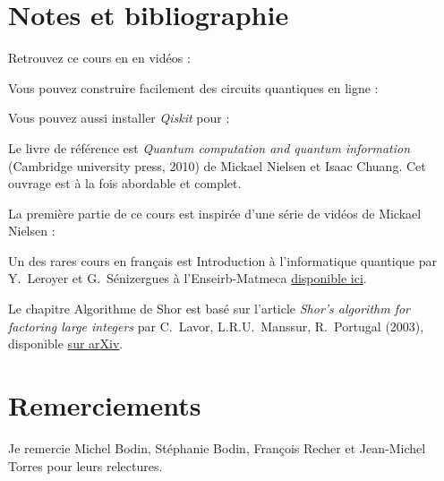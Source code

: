 
\clearemptydoublepage
\pagestyle{empty}\thispagestyle{empty}

\vspace*{\fill}

\section*{Notes et bibliographie}

Retrouvez ce cours en en vidéos : 

\medskip

Vous pouvez construire facilement des circuits quantiques en ligne :

Vous pouvez aussi installer \emph{Qiskit} pour \Python{}:

\medskip

Le livre de référence est \emph{Quantum computation and quantum information} (Cambridge university press, 2010) de Mickael Nielsen et Isaac Chuang. Cet ouvrage est à la fois abordable et complet.

\medskip

La première partie de ce cours est inspirée d'une série de vidéos de Mickael Nielsen :

\medskip

Un des rares cours en français est \og{}Introduction à l'informatique quantique\fg{} par Y.~Leroyer et G.~Sénizergues
à l'Enseirb-Matmeca \href{https://dept-info.labri.fr/~ges/ENSEIGNEMENT/CALCULQ/polycop_calculq.pdf}{disponible ici}.

\medskip

Le chapitre \og{}Algorithme de Shor\fg{} est basé sur l'article \emph{Shor's algorithm for factoring large integers} par C.~Lavor, L.R.U.~Manssur, R.~Portugal (2003), disponible \href{https://arxiv.org/abs/quant-ph/0303175}{sur arXiv}.


\section*{Remerciements}

Je remercie Michel Bodin, Stéphanie Bodin, François Recher et Jean-Michel Torres pour leurs relectures.






